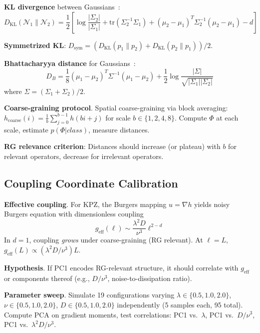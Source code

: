 \documentclass[aps,pre,reprint,amsmath,amssymb,superscriptaddress]{revtex4-2}
\begin{document}
\textbf{KL divergence} between Gaussians~\cite{CoverThomas2006}:
\begin{equation}
D_{\text{KL}}(\mathcal{N}_1 \| \mathcal{N}_2) = \frac{1}{2} \left[ \log \frac{|\Sigma_2|}{|\Sigma_1|} + \text{tr}(\Sigma_2^{-1}\Sigma_1) + (\mu_2 - \mu_1)^T \Sigma_2^{-1} (\mu_2 - \mu_1) - d \right]
\label{eq:KL}
\end{equation}

\textbf{Symmetrized KL}: $D_{\text{sym}} = (D_{\text{KL}}(p_1 \| p_2) + D_{\text{KL}}(p_2 \| p_1))/2$.

\textbf{Bhattacharyya distance} for Gaussians~\cite{Bhattacharyya1943}:
\begin{equation}
D_B = \frac{1}{8}(\mu_1 - \mu_2)^T \Sigma^{-1} (\mu_1 - \mu_2) + \frac{1}{2} \log \frac{|\Sigma|}{\sqrt{|\Sigma_1||\Sigma_2|}}
\label{eq:Bhattacharyya}
\end{equation}
where $\Sigma = (\Sigma_1 + \Sigma_2)/2$.

\textbf{Coarse-graining protocol}. Spatial coarse-graining via block averaging: $h_{\text{coarse}}(i) = \frac{1}{b}\sum_{j=0}^{b-1} h(bi + j)$ for scale $b \in \{1,2,4,8\}$. Compute $\Phi$ at each scale, estimate $p(\Phi|class)$, measure distances.

\textbf{RG relevance criterion}: Distances should increase (or plateau) with $b$ for relevant operators, decrease for irrelevant operators.

\subsection{Coupling Coordinate Calibration}

\textbf{Effective coupling}. For KPZ, the Burgers mapping $u = \nabla h$ yields noisy Burgers equation with dimensionless coupling~\cite{Forster1977}
\begin{equation}
g_{\text{eff}}(\ell) \sim \frac{\lambda^2 D}{\nu^3} \ell^{2-d}
\label{eq:coupling}
\end{equation}
In $d=1$, coupling \textit{grows} under coarse-graining (RG relevant). At $\ell=L$, $g_{\text{eff}}(L) \propto (\lambda^2 D/\nu^3) L$.

\textbf{Hypothesis}. If PC1 encodes RG-relevant structure, it should correlate with $g_{\text{eff}}$ or components thereof (e.g., $D/\nu^3$, noise-to-dissipation ratio).

\textbf{Parameter sweep}. Simulate 19 configurations varying $\lambda \in \{0.5, 1.0, 2.0\}$, $\nu \in \{0.5, 1.0, 2.0\}$, $D \in \{0.5, 1.0, 2.0\}$ independently (5 samples each, 95 total). Compute PCA on gradient moments, test correlations: PC1 vs.~$\lambda$, PC1 vs.~$D/\nu^3$, PC1 vs.~$\lambda^2 D/\nu^3$.
\end{document}
